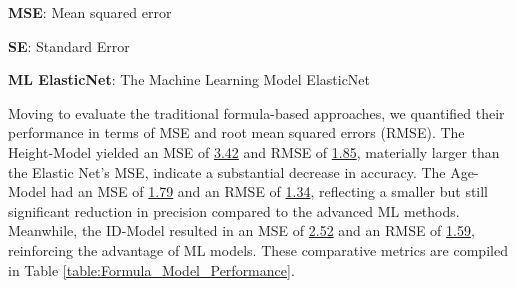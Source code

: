 \documentclass[11pt]{article}
\begin{document}
\begin{table}[h]
\caption{\protect\hyperlink{file-table-1-pkl}{Machine learning models performance comparison.}}
\label{table:ML_Model_Performance}
\begin{threeparttable}
\renewcommand{\TPTminimum}{\linewidth}
\begin{tablenotes}
\footnotesize
\item \textbf{MSE}: Mean squared error
\item \textbf{SE}: Standard Error
\item \textbf{ML ElasticNet}: The Machine Learning Model ElasticNet
\end{tablenotes}
\end{threeparttable}
\end{table}

Moving to evaluate the traditional formula-based approaches, we quantified their performance in terms of MSE and root mean squared errors (RMSE). The Height-Model yielded an MSE of \hyperlink{B0a}{3.42} and RMSE of \hyperlink{B0b}{1.85}, materially larger than the Elastic Net's MSE, indicate a substantial decrease in accuracy. The Age-Model had an MSE of \hyperlink{B1a}{1.79} and an RMSE of \hyperlink{B1b}{1.34}, reflecting a smaller but still significant reduction in precision compared to the advanced ML methods. Meanwhile, the ID-Model resulted in an MSE of \hyperlink{B2a}{2.52} and an RMSE of \hyperlink{B2b}{1.59}, reinforcing the advantage of ML models. These comparative metrics are compiled in Table \ref{table:Formula_Model_Performance}.
\end{document}
